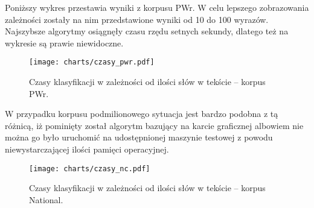 Poniższy wykres przestawia wyniki z korpusu PWr. W celu lepszego zobrazowania zależności zostały na nim przedstawione wyniki od 10 do 100 wyrazów. Najszybsze algorytmy osiągnęły czasu rzędu setnych sekundy, dlatego też na wykresie są prawie niewidoczne.

\begin{figure}[H]
	\centering
	\texttt{[image: charts/czasy\_pwr.pdf]}
	\label{Rysunek}
	\caption{Czasy klasyfikacji w zależności od ilości słów w tekście -- korpus PWr.}
\end{figure}

\newpage

W przypadku korpusu podmilionowego sytuacja jest bardzo podobna z tą różnicą, iż pominięty został algorytm bazujący na karcie graficznej albowiem nie można go było uruchomić na udostępnionej maszynie testowej z powodu niewystarczającej ilości pamięci operacyjnej.

\begin{figure}[H]
	\centering
	\texttt{[image: charts/czasy\_nc.pdf]}
	\label{Rysunek}
	\caption{Czasy klasyfikacji w zależności od ilości słów w tekście -- korpus National.}
\end{figure}
